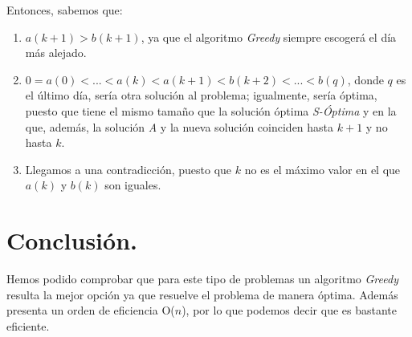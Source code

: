 \documentclass[11pt,a4paper]{article}
\begin{document}
		\par
		Entonces, sabemos que:

		\begin{enumerate}

			\item
			$a(k+1) > b(k+1)$, ya que el algoritmo \textit{Greedy} siempre escogerá el día más alejado.
			\item
			$0 = a(0) < ... < a(k) < a(k+1) < b(k+2) < ... < b(q)$, donde $q$ es el último día, sería otra solución al problema; igualmente, sería óptima, puesto que tiene el mismo tamaño que la solución óptima \textit{S-Óptima} y en la que, además, la solución \textit{A} y la nueva solución coinciden hasta $k+1$ y no hasta $k$.

			\item
			Llegamos a una contradicción, puesto que $k$ no es el máximo valor en el que $a(k)$ y $b(k)$ son iguales.

		\end{enumerate}

	\section{Conclusión.}

		\par
		Hemos podido comprobar que para este tipo de problemas un algoritmo \textit{Greedy} resulta la mejor opción ya que resuelve el problema de manera óptima. Además presenta un orden de
		eficiencia O($n$), por lo que podemos decir que es bastante eficiente.
\end{document}
